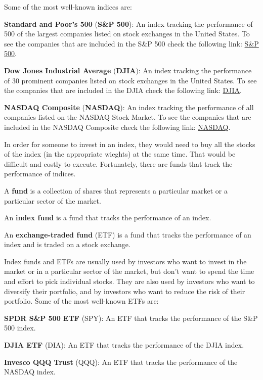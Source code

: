 Some of the most well-known indices are:
\bit
\item \textbf{Standard and Poor's 500} (\textbf{S\&P 500}): An index tracking the performance of 500 of the largest
companies listed on stock exchanges in the United States. To see the companies that are included in the S\&P 500 check
the following link: \href{https://www.slickcharts.com/sp500}{S\&P 500}.
\item \textbf{Dow Jones Industrial Average} (\textbf{DJIA}): An index tracking the performance of 30 prominent companies listed
on stock exchanges in the United States. To see the companies that are included in the DJIA check the following link:
\href{https://www.slickcharts.com/dowjones}{DJIA}.
\item \textbf{NASDAQ Composite} (\textbf{NASDAQ}): An index tracking the performance of all companies listed on the
NASDAQ Stock Market. To see the companies that are included in the NASDAQ Composite check the following link:
\href{https://www.slickcharts.com/nasdaq100}{NASDAQ}.
\eit

In order for someone to invest in an index, they would need to buy all the stocks of the index (in the appropriate
wieghts) at the same time. That would be difficult and costly to execute. Fortunately, there are funds that track the
performance of indices.

\bd[Fund]
A \textbf{fund} is a collection of shares that represents a particular market or a particular sector of the market.
\ed

An \textbf{index fund} is a fund that tracks the performance of an index.
\ed

An \textbf{exchange-traded fund} (ETF) is a fund that tracks the performance of an index and is traded on a stock
exchange.
\ed

Index funds and ETFs are usually used by investors who want to invest in the market or in a particular sector of the
market, but don't want to spend the time and effort to pick individual stocks. They are also used by investors who
want to diversify their portfolio, and by investors who want to reduce the risk of their portfolio. \v

Some of the most well-known ETFs are:
\bit
\item \textbf{SPDR S\&P 500 ETF} (SPY): An ETF that tracks the performance of the S\&P 500 index.
\item \textbf{DJIA ETF} (DIA): An ETF that tracks the performance of the DJIA index.
\item \textbf{Invesco QQQ Trust} (QQQ): An ETF that tracks the performance of the NASDAQ index.
\eit

